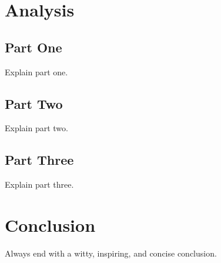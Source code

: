 \documentclass[11pt]{article}
\begin{document}
\begin{multicols}{2}
\section{\textbf{Analysis}}
  \subsection{Part One}
  Explain part one.

  \subsection{Part Two}
  Explain part two.
  
  \subsection{Part Three}
  Explain part three.



\section{\textbf{Conclusion}}
Always end with a witty, inspiring, and concise conclusion.



\raggedright



\end{multicols}
\end{document}
